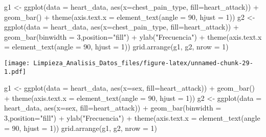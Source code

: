\documentclass[
]{article}
\newenvironment{Shaded}{\begin{snugshade}}{\end{snugshade}}
\newcommand{\AttributeTok}[1]{\textcolor[rgb]{0.77,0.63,0.00}{#1}}
\newcommand{\DecValTok}[1]{\textcolor[rgb]{0.00,0.00,0.81}{#1}}
\newcommand{\FunctionTok}[1]{\textcolor[rgb]{0.00,0.00,0.00}{#1}}
\newcommand{\NormalTok}[1]{#1}
\newcommand{\OtherTok}[1]{\textcolor[rgb]{0.56,0.35,0.01}{#1}}
\newcommand{\SpecialCharTok}[1]{\textcolor[rgb]{0.00,0.00,0.00}{#1}}
\newcommand{\StringTok}[1]{\textcolor[rgb]{0.31,0.60,0.02}{#1}}
\begin{document}
\begin{Shaded}
\begin{Highlighting}[]
\NormalTok{g1 }\OtherTok{\textless{}{-}} \FunctionTok{ggplot}\NormalTok{(}\AttributeTok{data =}\NormalTok{ heart\_data, }\FunctionTok{aes}\NormalTok{(}\AttributeTok{x=}\NormalTok{chest\_pain\_type, }\AttributeTok{fill=}\NormalTok{heart\_attack)) }\SpecialCharTok{+} \FunctionTok{geom\_bar}\NormalTok{() }\SpecialCharTok{+}
\FunctionTok{theme}\NormalTok{(}\AttributeTok{axis.text.x =} \FunctionTok{element\_text}\NormalTok{(}\AttributeTok{angle =} \DecValTok{90}\NormalTok{, }\AttributeTok{hjust =} \DecValTok{1}\NormalTok{))}
\NormalTok{g2 }\OtherTok{\textless{}{-}} \FunctionTok{ggplot}\NormalTok{(}\AttributeTok{data =}\NormalTok{ heart\_data, }\FunctionTok{aes}\NormalTok{(}\AttributeTok{x=}\NormalTok{chest\_pain\_type, }\AttributeTok{fill=}\NormalTok{heart\_attack)) }\SpecialCharTok{+} \FunctionTok{geom\_bar}\NormalTok{(}\AttributeTok{binwidth =} \DecValTok{3}\NormalTok{,}\AttributeTok{position=}\StringTok{"fill"}\NormalTok{) }\SpecialCharTok{+}
\FunctionTok{ylab}\NormalTok{(}\StringTok{"Frecuencia"}\NormalTok{) }\SpecialCharTok{+}
\FunctionTok{theme}\NormalTok{(}\AttributeTok{axis.text.x =} \FunctionTok{element\_text}\NormalTok{(}\AttributeTok{angle =} \DecValTok{90}\NormalTok{, }\AttributeTok{hjust =} \DecValTok{1}\NormalTok{))}
\FunctionTok{grid.arrange}\NormalTok{(g1, g2, }\AttributeTok{nrow =} \DecValTok{1}\NormalTok{)}
\end{Highlighting}
\end{Shaded}

\texttt{[image: Limpieza\_Analisis\_Datos\_files/figure-latex/unnamed-chunk-29-1.pdf]}

\begin{Shaded}
\begin{Highlighting}[]
\NormalTok{g1 }\OtherTok{\textless{}{-}} \FunctionTok{ggplot}\NormalTok{(}\AttributeTok{data =}\NormalTok{ heart\_data, }\FunctionTok{aes}\NormalTok{(}\AttributeTok{x=}\NormalTok{sex, }\AttributeTok{fill=}\NormalTok{heart\_attack)) }\SpecialCharTok{+} \FunctionTok{geom\_bar}\NormalTok{() }\SpecialCharTok{+}
\FunctionTok{theme}\NormalTok{(}\AttributeTok{axis.text.x =} \FunctionTok{element\_text}\NormalTok{(}\AttributeTok{angle =} \DecValTok{90}\NormalTok{, }\AttributeTok{hjust =} \DecValTok{1}\NormalTok{))}
\NormalTok{g2 }\OtherTok{\textless{}{-}} \FunctionTok{ggplot}\NormalTok{(}\AttributeTok{data =}\NormalTok{ heart\_data, }\FunctionTok{aes}\NormalTok{(}\AttributeTok{x=}\NormalTok{sex, }\AttributeTok{fill=}\NormalTok{heart\_attack)) }\SpecialCharTok{+} \FunctionTok{geom\_bar}\NormalTok{(}\AttributeTok{binwidth =} \DecValTok{3}\NormalTok{,}\AttributeTok{position=}\StringTok{"fill"}\NormalTok{) }\SpecialCharTok{+}
\FunctionTok{ylab}\NormalTok{(}\StringTok{"Frecuencia"}\NormalTok{) }\SpecialCharTok{+}
\FunctionTok{theme}\NormalTok{(}\AttributeTok{axis.text.x =} \FunctionTok{element\_text}\NormalTok{(}\AttributeTok{angle =} \DecValTok{90}\NormalTok{, }\AttributeTok{hjust =} \DecValTok{1}\NormalTok{))}
\FunctionTok{grid.arrange}\NormalTok{(g1, g2, }\AttributeTok{nrow =} \DecValTok{1}\NormalTok{)}
\end{Highlighting}
\end{Shaded}
\end{document}
